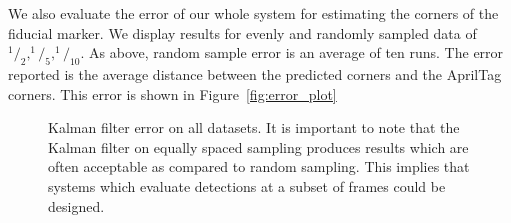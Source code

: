 \documentclass[letterpaper,10pt,conference]{IEEEtran}
\begin{document}
We also evaluate the error of our whole system for estimating the corners of the fiducial marker.  We display results for evenly and randomly sampled data of $^1/_2, ^1/_5, ^1/_10$.  As above, random sample error is an average of ten runs.  The error reported is the average distance between the predicted corners and the AprilTag corners. This error is shown in Figure~\ref{fig:error_plot}
\begin{figure}
\centering
{}

\caption{Kalman filter error on all datasets.  It is important to note that the Kalman filter on equally spaced sampling produces results which are often acceptable as compared to random sampling. This implies that systems which evaluate detections at a subset of frames could be designed.}
\label{fig:kalman_error}
\end{figure}
\end{document}
